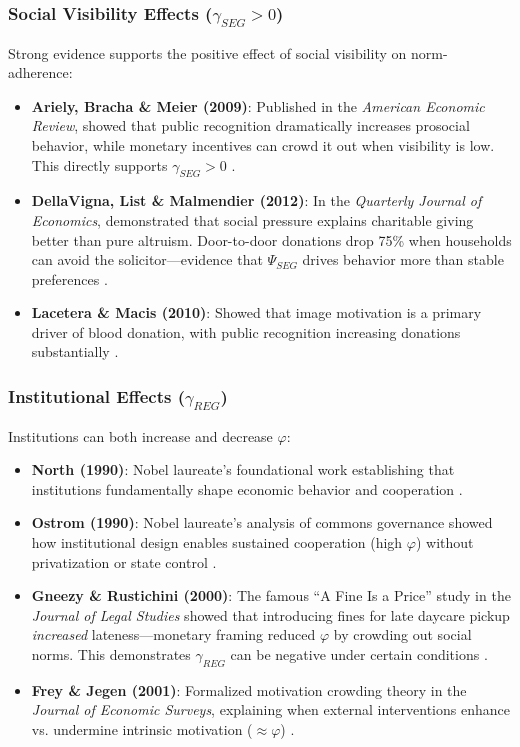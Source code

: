\subsubsection{Social Visibility Effects ($\gamma_{SEG} > 0$)}

Strong evidence supports the positive effect of social visibility on norm-adherence:

\begin{itemize}
\item \textbf{Ariely, Bracha \& Meier (2009)}: Published in the \textit{American Economic Review}, showed that public recognition dramatically increases prosocial behavior, while monetary incentives can crowd it out when visibility is low. This directly supports $\gamma_{SEG} > 0$ \cite{ariely2009}.

\item \textbf{DellaVigna, List \& Malmendier (2012)}: In the \textit{Quarterly Journal of Economics}, demonstrated that social pressure explains charitable giving better than pure altruism. Door-to-door donations drop 75\% when households can avoid the solicitor---evidence that $\Psi_{SEG}$ drives behavior more than stable preferences \cite{dellavigna2012}.

\item \textbf{Lacetera \& Macis (2010)}: Showed that image motivation is a primary driver of blood donation, with public recognition increasing donations substantially \cite{lacetera2010}.
\end{itemize}

\subsubsection{Institutional Effects ($\gamma_{REG}$)}

Institutions can both increase and decrease $\varphi$:

\begin{itemize}
\item \textbf{North (1990)}: Nobel laureate's foundational work establishing that institutions fundamentally shape economic behavior and cooperation \cite{PAP-north1990institutions}.

\item \textbf{Ostrom (1990)}: Nobel laureate's analysis of commons governance showed how institutional design enables sustained cooperation (high $\varphi$) without privatization or state control \cite{ostrom1990}.

\item \textbf{Gneezy \& Rustichini (2000)}: The famous ``A Fine Is a Price'' study in the \textit{Journal of Legal Studies} showed that introducing fines for late daycare pickup \textit{increased} lateness---monetary framing reduced $\varphi$ by crowding out social norms. This demonstrates $\gamma_{REG}$ can be negative under certain conditions \cite{gneezy2000}.

\item \textbf{Frey \& Jegen (2001)}: Formalized motivation crowding theory in the \textit{Journal of Economic Surveys}, explaining when external interventions enhance vs. undermine intrinsic motivation ($\approx \varphi$) \cite{frey2001}.
\end{itemize}

